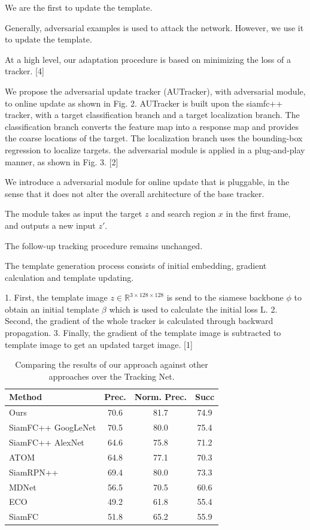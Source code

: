 \documentclass[journal]{IEEEtran}
\begin{document}
We are the  first to update the template.

Generally, adversarial examples is used to attack the network. However, we use it to update the template.

At a high level, our adaptation procedure is based on minimizing the loss of a tracker. [4]

We propose the adversarial update tracker (AUTracker), with adversarial module, to online update as shown in Fig. 2. AUTracker is built upon the siamfc++ tracker, with a target classification branch and a target localization branch. The classification branch converts the feature map into a response map and provides the coarse locations of the target. The localization branch uses the bounding-box regression to localize targets. the adversarial module is applied in a plug-and-play manner, as shown in Fig. 3. [2]

We introduce a adversarial module for online update that is pluggable, in the sense that it does not alter the overall architecture of the base tracker.

The module takes as input the target $z$ and search region $x$ in the first frame, and outputs a new input $z'$.

The follow-up tracking procedure remains unchanged.

The template generation process consists of initial embedding, gradient calculation and template updating.

1. First, the template image $z\in\mathbb R^{3\times128\times 128}$ is send to the siamese backbone $\phi$ to obtain an initial template $\beta$ which is used to calculate the initial loss L.
2. Second, the gradient of the whole tracker is calculated through backward propagation.
3. Finally, the gradient of the template image is subtracted to template image to get an updated target image. [1]

\begin{table}
\centering
\caption{Comparing the results of our approach against other approaches over the Tracking Net.}
\begin{tabular}{l c c c}
\toprule
Method   &  Prec.   &  Norm. Prec. & Succ  \\
\midrule
Ours  &  70.6&  81.7 &74.9 \\
SiamFC++ GoogLeNet& 70.5 & 80.0 & 75.4 \\
SiamFC++ AlexNet  & 64.6 & 75.8 & 71.2 \\
ATOM              & 64.8 & 77.1 & 70.3 \\
SiamRPN++&  69.4 & 80.0 &73.3 \\
MDNet	 &  56.5&  70.5 &60.6 \\
ECO	 &  49.2&  61.8 &55.4 \\
SiamFC	 &  51.8&  65.2 &55.9 \\
\bottomrule
\end{tabular}
\end{table}
\end{document}
